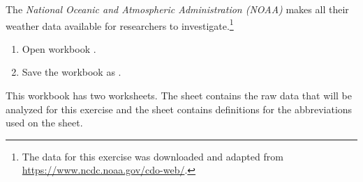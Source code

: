 The \textit{National Oceanic and Atmospheric Administration (NOAA)} makes all their weather data available for researchers to investigate.\footnote{The data for this exercise was downloaded and adapted from \url{https://www.ncdc.noaa.gov/cdo-web/}.}

\begin{enumerate}
	\item Open workbook .
	\item Save the workbook as .
\end{enumerate}

This workbook has two worksheets. The  sheet contains the raw data that will be analyzed for this exercise and the  sheet contains definitions for the abbreviations used on the  sheet.

